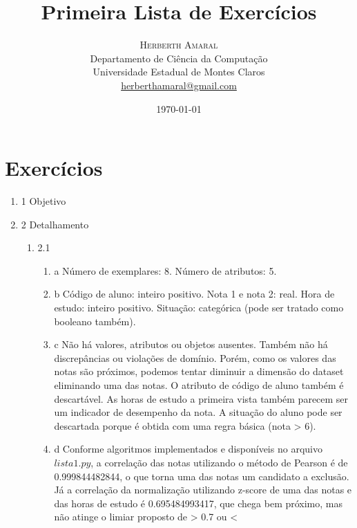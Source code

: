 \documentclass[11pt]{article}
\title{\vspace{.5cm}\fontsize{24pt}{10pt}\selectfont\textbf{\sc Primeira Lista de Exercícios}} %
\author{
\large
\textsc{Herberth Amaral}\\[2mm]
\normalsize Departamento de Ciência da Computação \\
\normalsize Universidade Estadual de Montes Claros \\
\normalsize \href{mailto:herberthamaral@gmail.com}{herberthamaral@gmail.com}
\vspace{-5mm}
}
\date{\today}
\begin{document}
\maketitle %

\thispagestyle{fancy} %

\newpage

\section*{Exercícios}

\begin{enumerate}
    \item{1} Objetivo
    \item{2} Detalhamento
        \begin{enumerate}
            \item{2.1}
                \begin{enumerate}
                    \item{a} Número de exemplares: 8. Número de atributos: 5.
                    \item{b} Código de aluno: inteiro positivo. Nota 1 e nota
                        2: real. Hora de estudo: inteiro positivo. Situação:
                        categórica (pode ser tratado como booleano também).
                    \item{c} Não há valores, atributos ou objetos ausentes.
                        Também não há discrepâncias ou violações de domínio.
                        Porém, como os valores das notas são próximos, podemos
                        tentar diminuir a dimensão do dataset eliminando uma
                        das notas. O atributo de código de aluno também é
                        descartável. As horas de estudo a primeira vista também
                        parecem ser um indicador de desempenho da nota. A
                        situação do aluno pode ser descartada porque é obtida
                        com uma regra básica (nota > 6).
                    \item{d} Conforme algoritmos implementados e disponíveis no
                        arquivo $lista1.py$, a correlação das notas utilizando
                        o método de Pearson é de 0.999844482844, o que torna
                        uma das notas um candidato a exclusão. Já a correlação
                        da normalização utilizando z-score de uma das notas e
                        das horas de estudo é 0.695484993417, que chega bem
                        próximo, mas não atinge o limiar proposto de > 0.7 ou <

\end{enumerate}
\end{enumerate}
\end{enumerate}
\end{document}

